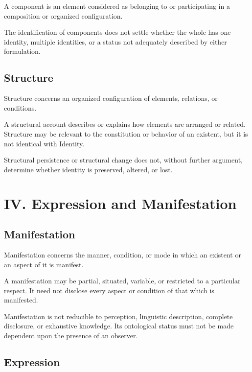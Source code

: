 A component is an element considered as belonging to or participating
in a composition or organized configuration.

The identification of components does not settle whether the whole
has one identity, multiple identities, or a status not adequately
described by either formulation.


\subsection*{Structure}

Structure concerns an organized configuration of elements, relations,
or conditions.

A structural account describes or explains how elements are arranged
or related. Structure may be relevant to the constitution or behavior
of an existent, but it is not identical with Identity.

Structural persistence or structural change does not, without further
argument, determine whether identity is preserved, altered, or lost.



\section*{IV. Expression and Manifestation}


\subsection*{Manifestation}

Manifestation concerns the manner, condition, or mode in which an
existent or an aspect of it is manifest.

A manifestation may be partial, situated, variable, or restricted
to a particular respect. It need not disclose every aspect or condition
of that which is manifested.

Manifestation is not reducible to perception, linguistic description,
complete disclosure, or exhaustive knowledge. Its ontological status
must not be made dependent upon the presence of an observer.


\subsection*{Expression}


